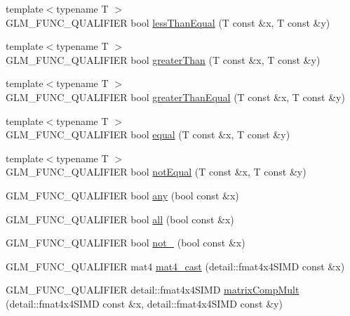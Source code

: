 \begin{DoxyCompactItemize}
\item 
{\footnotesize template$<$typename T $>$ }\\G\+L\+M\+\_\+\+F\+U\+N\+C\+\_\+\+Q\+U\+A\+L\+I\+F\+I\+E\+R bool \hyperlink{namespaceglm_a299eb11fb67637d37144dc0fcc6c6ff3}{less\+Than\+Equal} (T const \&x, T const \&y)
\item 
{\footnotesize template$<$typename T $>$ }\\G\+L\+M\+\_\+\+F\+U\+N\+C\+\_\+\+Q\+U\+A\+L\+I\+F\+I\+E\+R bool \hyperlink{namespaceglm_ae567b870c79fb61cf069d489133eaf48}{greater\+Than} (T const \&x, T const \&y)
\item 
{\footnotesize template$<$typename T $>$ }\\G\+L\+M\+\_\+\+F\+U\+N\+C\+\_\+\+Q\+U\+A\+L\+I\+F\+I\+E\+R bool \hyperlink{namespaceglm_a03e93d49cec76267c3e11fd68381639a}{greater\+Than\+Equal} (T const \&x, T const \&y)
\item 
{\footnotesize template$<$typename T $>$ }\\G\+L\+M\+\_\+\+F\+U\+N\+C\+\_\+\+Q\+U\+A\+L\+I\+F\+I\+E\+R bool \hyperlink{namespaceglm_a9943cfbeef0a00a2becb541e9e3818ed}{equal} (T const \&x, T const \&y)
\item 
{\footnotesize template$<$typename T $>$ }\\G\+L\+M\+\_\+\+F\+U\+N\+C\+\_\+\+Q\+U\+A\+L\+I\+F\+I\+E\+R bool \hyperlink{namespaceglm_ab4ee9100dc2b4e41ef91ff6898f979e2}{not\+Equal} (T const \&x, T const \&y)
\item 
G\+L\+M\+\_\+\+F\+U\+N\+C\+\_\+\+Q\+U\+A\+L\+I\+F\+I\+E\+R bool \hyperlink{namespaceglm_ad41a7e46efe59ecfa701a0d561b7e8fa}{any} (bool const \&x)
\item 
G\+L\+M\+\_\+\+F\+U\+N\+C\+\_\+\+Q\+U\+A\+L\+I\+F\+I\+E\+R bool \hyperlink{namespaceglm_a55c4531f4a0de48f87a20702d96d4289}{all} (bool const \&x)
\item 
G\+L\+M\+\_\+\+F\+U\+N\+C\+\_\+\+Q\+U\+A\+L\+I\+F\+I\+E\+R bool \hyperlink{namespaceglm_a081b70b3c919d22f18bb04e6f9c3b7ca}{not\+\_\+} (bool const \&x)
\item 
G\+L\+M\+\_\+\+F\+U\+N\+C\+\_\+\+Q\+U\+A\+L\+I\+F\+I\+E\+R mat4 \hyperlink{namespaceglm_aaea24a8e252f68832f4d368be2035889}{mat4\+\_\+cast} (detail\+::fmat4x4\+S\+I\+M\+D const \&x)
\item 
G\+L\+M\+\_\+\+F\+U\+N\+C\+\_\+\+Q\+U\+A\+L\+I\+F\+I\+E\+R detail\+::fmat4x4\+S\+I\+M\+D \hyperlink{namespaceglm_a3f8b69f9fddfae106e1a18ad66a17a1a}{matrix\+Comp\+Mult} (detail\+::fmat4x4\+S\+I\+M\+D const \&x, detail\+::fmat4x4\+S\+I\+M\+D const \&y)
\item 

\end{DoxyCompactItemize}
